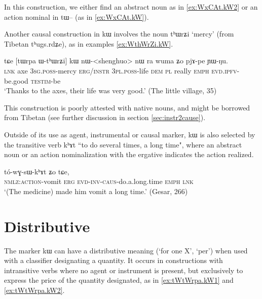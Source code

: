\documentclass[oldfontcommands,oneside,a4paper,11pt]{article}
\newcommand{\ipa}[1]{{\phon #1}} %
\begin{document}
In this construction, we either find  an abstract noun as in \ref{ex:WxCAt.kW2}  or an action nominal in \ipa{tɯ--} (as in \ref{ex:WxCAt.kW}). 

Another causal construction in \ipa{kɯ} involves the noun \ipa{tʰɯrʑi} `mercy' (from Tibetan \ipa{tʰugs.rdʑe}), as in examples \ref{ex:WthWrZi.kW}.

  \begin{exe}
\ex \label{ex:WthWrZi.kW}
\gll
\ipa{tɕe}  	[\ipa{tɯrpa}  	\ipa{ɯ-tʰɯrʑi}]  	\ipa{kɯ}  	\ipa{nɯ}-<shenghuo>  	\ipa{nɯ} \ipa{ra}  	\ipa{wuma}  	\ipa{ʑo}  	\ipa{pjɤ-pe}  	\ipa{ɲɯ-ŋu.}  \\
\textsc{lnk} axe \textsc{3sg.poss}-mercy \textsc{erg/instr} \textsc{3pl.poss}-life \textsc{dem} \textsc{pl} really \textsc{emph} \textsc{evd.ipfv}-be.good \textsc{testim}-be \\
\glt `Thanks to the axes, their life was very good.' (The little village, 35)
  \end{exe}
  
  This construction is poorly attested with native nouns, and might be borrowed from Tibetan (see further discussion in section \ref{sec:instr2cause}).
  

 Outside of its use as agent, instrumental or causal marker, \ipa{kɯ} is also selected by the transitive verb \ipa{kʰɤt} ``to do several times, a long time", where an abstract noun or an action nominalization with the ergative indicates the action realized.
 \begin{exe} 
\ex \label{ex:instr5}
\gll   [\ipa{tɯ-qioʁ}]   	\ipa{\textbf{kɯ}}   	\ipa{tó-wɣ-sɯ-kʰɤt}   	\ipa{ʑo}   	\ipa{tɕe,}       \\
  \textsc{nmlz:action}-vomit \textsc{erg} \textsc{evd-inv-caus}-do.a.long.time \textsc{emph} \textsc{lnk}\\
 \glt  `(The medicine) made him vomit a long time.' (Gesar, 266)
\end{exe}  
 
 
\section{Distributive} \label{sec:distributive}
The marker \ipa{kɯ} can have   a distributive meaning (`for one X', `per') when used with a classifier designating a quantity. It occurs  in constructions with intransitive verbs where no agent or instrument is present, but exclusively to express the price of the quantity designated, as in  \ref{ex:tWtWrpa.kW1} and \ref{ex:tWtWrpa.kW2}.
\end{document}
